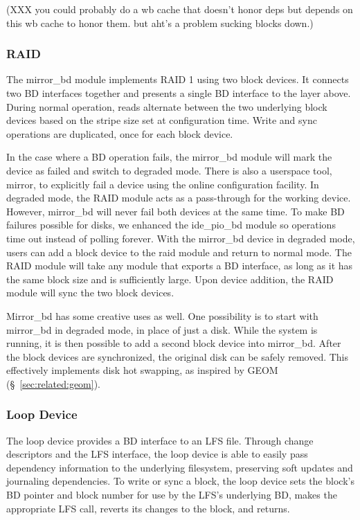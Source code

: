 (XXX you could probably do a wb cache that doesn't honor deps but depends on
this wb cache to honor them. but aht's a problem sucking blocks down.)

\subsubsection{RAID}
\label{sec:solution:impl:raid}

The mirror\_bd module implements RAID 1 using two block devices. It connects two
BD interfaces together and presents a single BD interface to the layer above.
During normal operation, reads alternate between the two underlying block
devices based on the stripe size set at configuration time. Write and sync
operations are duplicated, once for each block device.

In the case where a BD operation fails, the mirror\_bd module will mark the
device as failed and switch to degraded mode. There is also a userspace tool,
mirror, to explicitly fail a device using the online configuration facility. In
degraded mode, the RAID module acts as a pass-through for the working device.
However, mirror\_bd will never fail both devices at the same time. To make BD
failures possible for disks, we enhanced the ide\_pio\_bd module so operations
time out instead of polling forever. With the mirror\_bd device in degraded
mode, users can add a block device to the raid module and return to normal mode.
The RAID module will take any module that exports a BD interface, as long as it
has the same block size and is sufficiently large. Upon device addition, the
RAID module will sync the two block devices.

Mirror\_bd has some creative uses as well. One possibility is to start with
mirror\_bd in degraded mode, in place of just a disk. While the system is
running, it is then possible to add a second block device into mirror\_bd.
After the block devices are synchronized, the original disk can be safely
removed. This effectively implements disk hot swapping, as inspired by GEOM
(\S~\ref{sec:related:geom}).

\subsubsection{Loop Device}
\label{sec:solution:impl:loop}

The loop device provides a BD interface to an LFS file. Through change
descriptors and the LFS interface, the loop device is able to easily pass
dependency information to the underlying filesystem, preserving soft updates and
journaling dependencies. To write or sync a block, the loop device sets the
block's BD pointer and block number for use by the LFS's underlying BD, makes
the appropriate LFS call, reverts its changes to the block, and returns.

